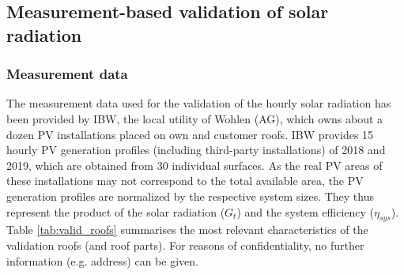 \subsection{Measurement-based validation of solar radiation}
\label{scenario_EW}

\subsubsection{Measurement data}
The measurement data used for the validation of the hourly solar radiation has been provided by IBW, the local utility of Wohlen (AG), which owns about a dozen PV installations placed on own and customer roofs. 
IBW provides 15 hourly PV generation profiles (including third-party installations) of 2018 and 2019, which are obtained from 30 individual surfaces.
As the real PV areas of these installations may not correspond to the total available area, the PV generation profiles are normalized by the respective system sizes. They thus represent the product of the solar radiation ($G_t$) and the system efficiency ($\eta_\mathit{sys}$).
Table \ref{tab:valid_roofs} summarises the most relevant characteristics of the validation roofs (and roof parts). For reasons of confidentiality, no further information (e.g. address) can be given.  

